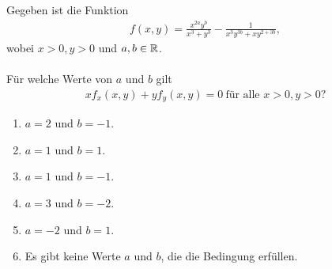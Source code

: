 \subsection*{}
Gegeben ist die Funktion
\begin{align*}
	f(x,y)
	=
	\frac{x^{2a} y^b}{x^3 +y^3}
	- 
	\frac{1}{x^3 y^{3b} + x y^{2 + 3b}},
\end{align*}
wobei $ x > 0, y > 0 $ und $ a,b \in \mathbb{R} $.\\
\\
Für welche Werte von $ a $ und $ b $ gilt
\begin{align*}
	x f_x(x,y) + y f_y(x,y) = 0 \ \textrm{für alle } x>0, y>0\textrm{?}
\end{align*}
\renewcommand{\labelenumi}{(\alph{enumi})}
\begin{enumerate}
	\item 
	$a = 2$ und $ b=-1 $.
	\item
	$a = 1$ und $ b=1 $.
	\item
	$a = 1$ und $ b=-1 $.
	\item
	$a = 3$ und $ b=-2 $.
	\item
	$a = -2$ und $ b=1 $.
	\item
	Es gibt keine Werte $ a $ und $ b $, die die Bedingung erfüllen.
\end{enumerate}